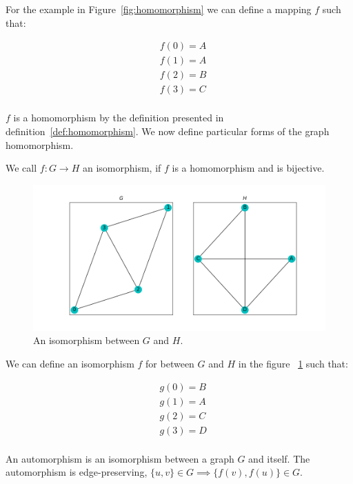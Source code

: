 \noindent  For the example in Figure~\ref{fig:homomorphism} we can define a mapping $f$ such that:

\begin{align*}
    &f(0) = A\\
    &f(1) = A\\
    &f(2) = B\\
    &f(3) = C\\ 
\end{align*}

\noindent $f$ is a homomorphism by the definition presented in definition~\ref{def:homomorphism}. 
We now define particular forms of the graph homomorphism.

\begin{dfn}
    We call $f: G \rightarrow H$ an isomorphism,
 if $f$ is a homomorphism and is bijective.
\end{dfn}

\begin{figure}[h!]
    \includegraphics[width=12cm]{Images/graph_isomoprhism.png}
    \centering
    \caption{An isomorphism between $G$ and $H$.}
    \label{fig:isomorphism}
\end{figure}

\noindent We can define an isomorphism $f$ for between $G$ and $H$ in the figure ~\ref{fig:isomorphism} such that:

\begin{align*}
    &g(0) = B\\
    &g(1) = A\\
    &g(2) = C\\
    &g(3) = D\\ 
\end{align*}

\begin{dfn}
    An automorphism is an isomorphism between a graph $G$ and itself. The automorphism 
    is edge-preserving, $\{u,v\} \in G \implies \{f(v),f(u)\} \in G$.
\end{dfn}

